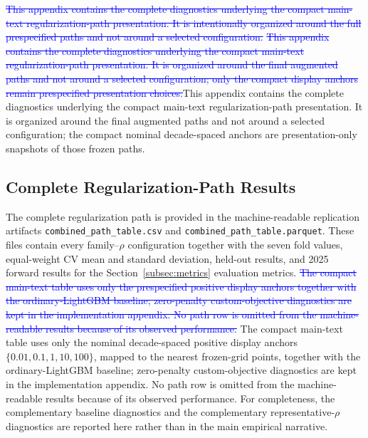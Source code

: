 \documentclass[10pt]{article}
\theoremstyle{definition}
\newcommand{\1}{\mathbf{1}}
\newcommand{\oldtext}[1]{\textcolor{blue}{\sout{#1}}}
\newcommand{\newtext}[1]{\textcolor{impGreen}{#1}}
\newcommand{\latesttext}[1]{\textcolor{latestPurple}{#1}}
\begin{document}
\oldtext{This appendix contains the complete diagnostics underlying the compact main-text
regularization-path presentation. It is intentionally organized around the full
prespecified paths and not around a selected configuration.}
\oldtext{This appendix contains the complete diagnostics underlying the compact main-text regularization-path presentation. It is organized around the final augmented paths and not around a selected configuration; only the compact display anchors remain prespecified presentation choices.}\latesttext{This appendix contains the complete diagnostics underlying the compact main-text regularization-path presentation. It is organized around the final augmented paths and not around a selected configuration; the compact nominal decade-spaced anchors are presentation-only snapshots of those frozen paths.}

\subsection{Complete Regularization-Path Results}

\newtext{The complete regularization path is provided} in the machine-readable replication
artifacts \texttt{combined\_path\_table.csv} and
\texttt{combined\_path\_table.parquet}. These files contain every family--$\rho$
configuration together with the seven fold values, equal-weight CV mean and
standard deviation, held-out results, and 2025 forward results for the
Section~\ref{subsec:metrics} evaluation metrics. \oldtext{The compact main-text table uses only the prespecified positive display anchors together with the ordinary-LightGBM baseline; zero-penalty custom-objective diagnostics are kept in the implementation appendix. No path row is omitted from the machine-readable results because of its observed performance.}
\latesttext{The compact main-text table uses only the nominal decade-spaced positive display anchors $\{0.01,0.1,1,10,100\}$, mapped to the nearest frozen-grid points, together with the ordinary-LightGBM baseline; zero-penalty custom-objective diagnostics are kept in the implementation appendix. No path row is omitted from the machine-readable results because of its observed performance.}
\latesttext{For completeness, the complementary baseline diagnostics and the complementary representative-$\rho$ diagnostics are reported here rather than in the main empirical narrative.}
\end{document}
